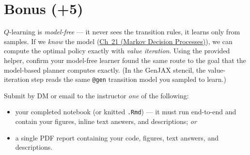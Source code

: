 \documentclass[11pt]{article}
\newcommand{\chmdp}{\href{https://josephausterweil.github.io/probintro/intro2/21_markov_decision_processes/}{Ch~21 (Markov Decision Processes)}}
\begin{document}
\section*{Bonus (+5)}
$Q$-learning is {\em model-free} --- it never sees the transition rules, it learns
only from samples. If we {\em know} the model (\chmdp{}), we can compute the
optimal policy exactly with {\em value iteration}. Using the provided helper,
confirm your model-free learner found the same route to the goal that the
model-based planner computes exactly. (In the GenJAX stencil, the value-iteration
step reads the same \texttt{@gen} transition model you sampled to learn.)

\vspace{0.5em}
 Submit by DM or email to the instructor {\em one} of
the following:
\begin{itemize}
    \item your completed notebook (or knitted \texttt{.Rmd}) --- it must run end-to-end and contain your figures, inline text answers, and descriptions; {\em or}
    \item a single PDF report containing your code, figures, text answers, and descriptions.
\end{itemize}



\end{document}
